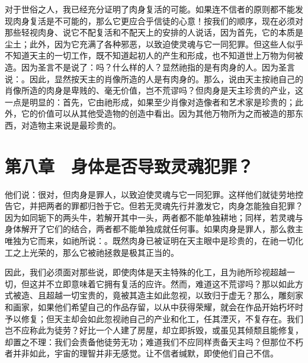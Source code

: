 对于世俗之人，我已经充分证明了肉身复活的可能。如果连不信者的原则都不能发现肉身复活是不可能的，那么它更应合乎信徒的心意！按我们的顺序，现在必须对那些轻视肉身、说它不配复活和不配天上的安排的人说话，因为首先，它的本质是尘土；此外，因为它充满了各种邪恶，以致迫使灵魂与它一同犯罪。但这些人似乎不知道天主的一切工作，既不知道起初人的产生和形成，也不知道世上万物为何被造。因为圣言不是说了：吗？什么样的人？显然祂指的是有肉身的人。因为圣言说：。因此，显然按天主的肖像所造的人是有肉身的。那么，说由天主按祂自己的肖像所造的肉身是卑贱的、毫无价值，岂不荒谬吗？但肉身是天主珍贵的产业，这一点是明显的：首先，它由祂形成，如果至少肖像对造像者和艺术家是珍贵的；此外，它的价值可以从其他受造物的创造中看出。因为其他万物所为之而被造的那东西，对造物主来说是最珍贵的。\par


\section{第八章　身体是否导致灵魂犯罪？}

他们说：很对，但肉身是罪人，以致迫使灵魂与它一同犯罪。这样他们就徒劳地控告它，并把两者的罪都归咎于它。但若无灵魂先行并激发它，肉身怎能独自犯罪？因为如同轭下的两头牛，若解开其中一头，两者都不能单独耕地；同样，若灵魂与身体解开了它们的结合，两者都不能单独成就任何事。如果肉身是罪人，那么救主唯独为它而来，如祂所说：。既然肉身已被证明在天主眼中是珍贵的，在祂一切化工之上光荣的，那么它被祂拯救是极其正当的。\par

因此，我们必须面对那些说，即使肉体是天主特殊的化工，且为祂所珍视超越一切，但这并不立即意味着它拥有复活的应许。然而，难道这不荒谬吗？那以如此方式被造、且超越一切宝贵的，竟被其造主如此忽视，以致归于虚无？那么，雕刻家和画家，如果他们希望自己的作品存留，以从中获得荣耀，就会在作品开始朽坏时予以修复；但天主却会如此忽视祂自己的产业和化工，任其湮灭，不复存在。我们岂不应称此为徒劳？好比一个人建了房屋，却立即拆毁，或虽见其倾颓且能修复，却置之不理：我们会责备他徒劳无功；难道我们不应同样责备天主吗？但那位不朽者并非如此，宇宙的理智并非无感觉。让不信者缄默，即使他们自己不信。\par

